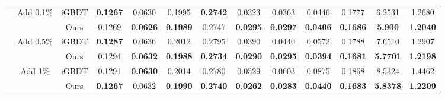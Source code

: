 \begin{table*}[t]
{\begin{tabular}{ccccccccccccc}
                                                                            & \multirow{2}{*}{Add 0.1\%} & iGBDT      & \textbf{0.1267} & 0.0630          & 0.1995          & \textbf{0.2742} & 0.0323          & 0.0363          & 0.0446          & 0.1777          & 6.2531                                                               & 1.2680                                                                   \\
                                                                            &                        & Ours       & 0.1269          & \textbf{0.0626} & \textbf{0.1989} & 0.2747          & \textbf{0.0295} & \textbf{0.0297} & \textbf{0.0406} & \textbf{0.1686} & \textbf{5.900}                                                       & \textbf{1.2040}                                                          \\\cline{2-13}
                                                                            & \multirow{2}{*}{Add 0.5\%} & iGBDT      & \textbf{0.1287} & 0.0636          & 0.2012          & 0.2795          & 0.0390          & 0.0440          & 0.0572          & 0.1788          & 7.6510                                                               & 1.2907                                                                   \\
                                                                            &                        & Ours       & 0.1294          & \textbf{0.0632} & \textbf{0.1988} & \textbf{0.2734} & \textbf{0.0290} & \textbf{0.0295} & \textbf{0.0394} & \textbf{0.1681} & \textbf{5.7701}                                                      & \textbf{1.2198}                                                          \\\cline{2-13}
                                                                            & \multirow{2}{*}{Add 1\%}   & iGBDT      & 0.1291          & \textbf{0.0630} & 0.2014          & 0.2780          & 0.0529          & 0.0603          & 0.0875          & 0.1868          & 8.5324                                                               & 1.4462                                                                   \\
                                                                            &                        & Ours       & \textbf{0.1267} & 0.0632          & \textbf{0.1990} & \textbf{0.2740} & \textbf{0.0262} & \textbf{0.0283} & \textbf{0.0440} & \textbf{0.1683} & \textbf{5.8378}                                                      & \textbf{1.2209}                                                          \\\midrule

\end{tabular}}
\end{table*}
